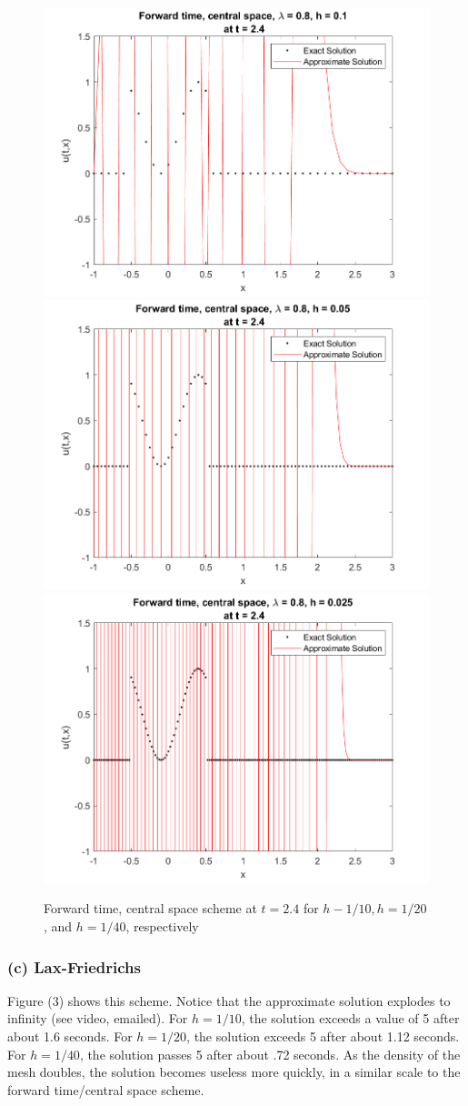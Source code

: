 \documentclass[12pt]{article}
\begin{document}
\begin{figure}
	\centering
	\includegraphics[width=.6\linewidth]{./code/b_forward_time_central_space_h_one_10th.png}	\includegraphics[width=.6\linewidth]{./code/b_forward_time_central_space_h_one_20th.png}
	\includegraphics[width=.6\linewidth]{./code/b_forward_time_central_space_h_one_40th.png}
	\caption{Forward time, central space scheme at $t=2.4$ for $h-1/10, h=1/20$, and $h=1/40$, respectively}
\end{figure}

\subsubsection*{(c) Lax-Friedrichs}

Figure (3) shows this scheme. Notice that the approximate solution explodes to infinity (see video, emailed). For $h=1/10$, the solution exceeds a value of 5 after about 1.6 seconds. For $h=1/20$, the solution exceeds 5 after about 1.12 seconds. For $h=1/40$, the solution passes 5 after about .72 seconds. As the density of the mesh doubles, the solution becomes useless more quickly, in a similar scale to the forward time/central space scheme.
\end{document}
